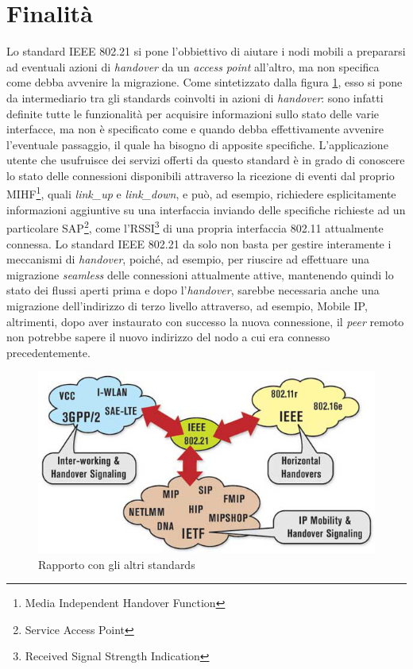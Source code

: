 \section{Finalità}
Lo standard IEEE 802.21 si pone l'obbiettivo di aiutare i nodi mobili a prepararsi ad eventuali azioni di {\em handover} da un {\em access point} all'altro, ma non specifica come debba avvenire la migrazione. Come sintetizzato dalla figura \ref{fig:rapporto}, esso si pone da intermediario tra gli standards coinvolti in azioni di {\em handover}: sono infatti definite tutte le funzionalità per acquisire informazioni sullo stato delle varie interfacce, ma non è specificato come e quando debba effettivamente avvenire l'eventuale passaggio, il quale ha bisogno di apposite specifiche. L'applicazione utente che usufruisce dei servizi offerti da questo standard è in grado di conoscere lo stato delle connessioni disponibili attraverso la ricezione di eventi dal proprio MIHF\footnote{Media Independent Handover Function}, quali {\em link\_up} e {\em link\_down}, e può, ad esempio, richiedere esplicitamente informazioni aggiuntive su una interfaccia inviando delle specifiche richieste ad un particolare SAP\footnote{Service Access Point}, come l'RSSI\footnote{Received Signal Strength Indication} di una propria interfaccia 802.11 attualmente connessa. Lo standard IEEE 802.21 da solo non basta per gestire interamente i meccanismi di {\em handover}, poiché, ad esempio, per riuscire ad effettuare una migrazione {\em seamless} delle connessioni attualmente attive, mantenendo quindi lo stato dei flussi aperti prima e dopo l'{\em handover}, sarebbe necessaria anche una migrazione dell'indirizzo di terzo livello attraverso, ad esempio, Mobile IP\cite{mobileip}, altrimenti, dopo aver instaurato con successo la nuova connessione, il {\em peer} remoto non potrebbe sapere il nuovo indirizzo del nodo a cui era connesso precedentemente.

\begin{figure}[h!]
\centering
\includegraphics[scale=0.6]{ieee80221_cloud.jpg}
\caption{Rapporto con gli altri standards}
\label{fig:rapporto}
\end{figure}

